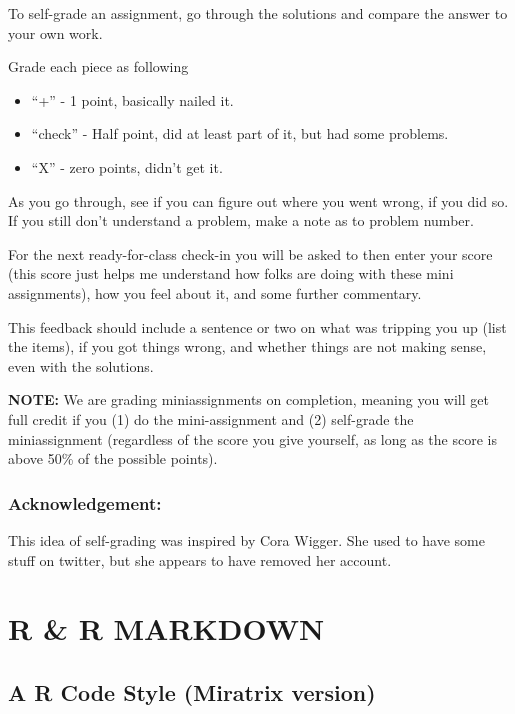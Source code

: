 \documentclass[
  letterpaper,
  DIV=11,
  numbers=noendperiod]{scrreprt}
\providecommand{\tightlist}{%
  \setlength{\itemsep}{0pt}\setlength{\parskip}{0pt}}\usepackage{longtable,booktabs,array}
\begin{document}

To self-grade an assignment, go through the solutions and compare the
answer to your own work.

Grade each piece as following

\begin{itemize}
\tightlist
\item
  ``+'' - 1 point, basically nailed it.
\item
  ``check'' - Half point, did at least part of it, but had some
  problems.
\item
  ``X'' - zero points, didn't get it.
\end{itemize}

As you go through, see if you can figure out where you went wrong, if
you did so. If you still don't understand a problem, make a note as to
problem number.

For the next ready-for-class check-in you will be asked to then enter
your score (this score just helps me understand how folks are doing with
these mini assignments), how you feel about it, and some further
commentary.

This feedback should include a sentence or two on what was tripping you
up (list the items), if you got things wrong, and whether things are not
making sense, even with the solutions.

\textbf{NOTE:} We are grading miniassignments on completion, meaning you
will get full credit if you (1) do the mini-assignment and (2)
self-grade the miniassignment (regardless of the score you give
yourself, as long as the score is above 50\% of the possible points).

\hypertarget{acknowledgement}{%
\section*{Acknowledgement:}\label{acknowledgement}}


This idea of self-grading was inspired by Cora Wigger. She used to have
some stuff on twitter, but she appears to have removed her account.

\part{R \& R MARKDOWN}

\hypertarget{a-r-code-style-miratrix-version}{%
\chapter{A R Code Style (Miratrix
version)}\label{a-r-code-style-miratrix-version}}
\end{document}
